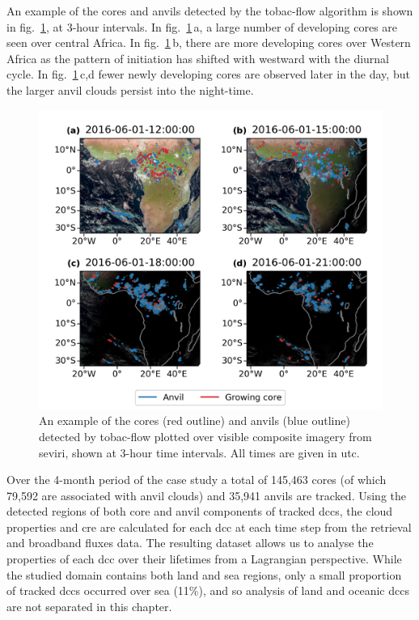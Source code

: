 An example of the cores and anvils detected by the tobac-flow algorithm is shown in fig.~\ref{fig:seviri_detection}, at 3-hour intervals. 
In fig.~\ref{fig:seviri_detection}\,a, a large number of developing cores are seen over central Africa. 
In fig.~\ref{fig:seviri_detection}\,b, there are more developing cores over Western Africa as the pattern of initiation has shifted with westward with the diurnal cycle.
In fig.~\ref{fig:seviri_detection}\,c,d fewer newly developing cores are observed later in the day, but the larger anvil clouds persist into the night-time.


\begin{figure}[tp]
    \includegraphics[width=\textwidth]{figures/chapter4_07.png}
    \caption[
    An example of the cores and anvils (detected by tobac-flow, shown at 3-hour time intervals
    ]{
    An example of the cores (red outline) and anvils (blue outline) detected by tobac-flow plotted over visible composite imagery from \acrshort{seviri}, shown at 3-hour time intervals. All times are given in \acrshort{utc}.
    }
    \label{fig:seviri_detection}
\end{figure}


Over the 4-month period of the case study a total of 145,463 cores (of which 79,592 are associated with anvil clouds) and 35,941 anvils are tracked. 
Using the detected regions of both core and anvil components of tracked \acrshort{dcc}s, the cloud properties and \acrshort{cre} are calculated for each \acrshort{dcc} at each time step from the retrieval and broadband fluxes data. 
The resulting dataset allows us to analyse the properties of each \acrshort{dcc} over their lifetimes from a Lagrangian perspective.
While the studied domain contains both land and sea regions, only a small proportion of tracked \acrshort{dcc}s occurred over sea (11\%), and so analysis of land and oceanic \acrshort{dcc}s are not separated in this chapter.

